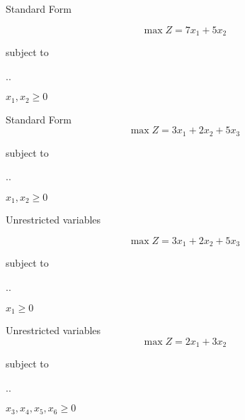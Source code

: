 \begin{frameExample}{Standard Form \label{example:02.12-01}}{}

\[     \max Z = 7x_1 + 5x_2 \]

{\centering
  subject to
  
  \sysdelim..%

    \vspace{3mm}
    $x_1, x_2  \geq 0$
    \par}





\end{frameExample}

\begin{frameExample}{Standard Form \label{example:02.12-02}}{}
    \[ \max Z = 3x_1 + 2x_2 + 5x_3\]
    {\centering
      subject to

      \sysdelim..%
\vspace{3mm}

    $x_1, x_2  \geq 0$
    \par}
    
  \end{frameExample}
  

\begin{frameExample}{Unrestricted variables \label{example:02-12-03}}{}

    \[\max Z = 3x_1 + 2x_2 + 5x_3 \]
    {\centering
      subject to

      \sysdelim..%

\vspace{3mm}
    $    x_1  \geq 0$
        \par}
\end{frameExample}

\begin{frameExample}{Unrestricted variables \label{example:02.12-04}}{}
  \[ \max Z = 2x_1 + 3x_2 \]
  {\centering
    subject to
    
    \sysdelim..%

    \vspace{3mm}
    $x_3, x_4,x_5, x_6  \geq 0$
  \par}
\end{frameExample}

